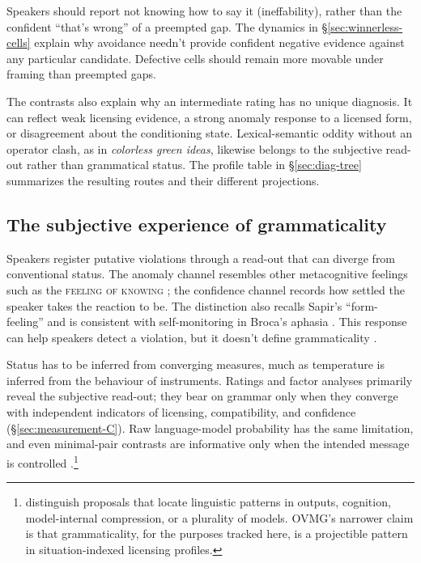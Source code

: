 \documentclass[12pt,letterpaper]{article}
\newcommand{\term}[1]{\textsc{#1}}
\newcommand{\mention}[1]{\textit{#1}}
\begin{document}
Speakers should report not knowing how to say it (ineffability), rather than
the confident
\enquote{that's wrong} of a preempted gap.
The dynamics in \S\ref{sec:winnerless-cells} explain why avoidance needn't
provide confident negative evidence against any particular candidate. Defective
cells should remain more movable under framing than preempted gaps.

The contrasts also explain why an intermediate rating has no unique diagnosis.
It can reflect weak licensing evidence, a strong anomaly response to a licensed
form, or disagreement about the conditioning state. Lexical-semantic oddity
without an operator clash, as in \mention{colorless green ideas}, likewise
belongs to the subjective read-out rather than grammatical status. The profile
table in \S\ref{sec:diag-tree} summarizes the resulting routes and their
different projections.

\subsection{The subjective experience of grammaticality}\label{sec:subjective}

Speakers register putative violations through a read-out that can diverge from
conventional status. The anomaly channel resembles other
metacognitive feelings such as the \term{feeling of knowing}
\autocite{hart1965}; the confidence channel records how settled the speaker
takes the reaction to be. The distinction also recalls Sapir's
\enquote{form-feeling} and is consistent with self-monitoring in Broca's aphasia
\autocite{Sapir1921,Sapir1927b,oomen2005}. This response can help speakers detect
a violation, but it doesn't define grammaticality \autocite{Fanselow2021}.

Status has to be inferred from converging measures, much as
temperature is inferred from the behaviour of instruments. Ratings and factor
analyses primarily reveal the subjective read-out; they bear on grammar only
when they converge with independent indicators of licensing, compatibility,
and confidence (\S\ref{sec:measurement-C}). Raw language-model probability has
the same limitation, and even minimal-pair contrasts are informative only when
the intended message is controlled \autocite{HuEtAl2026StringProbability}.\footnote{\textcite{nefdtLadyman2026RealPatterns} distinguish proposals that locate linguistic patterns in outputs, cognition, model-internal compression, or a plurality of models. OVMG's narrower claim is that grammaticality, for the purposes tracked here, is a projectible pattern in situation-indexed licensing profiles.}
\end{document}
